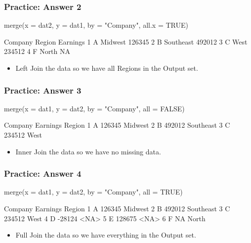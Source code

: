 \documentclass[10pt,american]{beamer}
\renewenvironment{Schunk}{}{}
\renewenvironment{Sinput}{}{}
\begin{document}
\begin{frame}[containsverbatim]
\frametitle{Practice: Answer 2}
\begin{Schunk}
\begin{Sinput}
 merge(x = dat2, y = dat1, by = "Company", all.x = TRUE)
\end{Sinput}
\begin{Soutput}
  Company    Region Earnings
1       A   Midwest   126345
2       B Southeast   492012
3       C      West   234512
4       F     North       NA
\end{Soutput}
\end{Schunk}
\begin{itemize}
\item Left Join the data so we have all Regions in the Output set.
\end{itemize}
\end{frame}


\begin{frame}[containsverbatim]
\frametitle{Practice: Answer 3}
\begin{Schunk}
\begin{Sinput}
 merge(x = dat1, y = dat2, by = "Company", all = FALSE)
\end{Sinput}
\begin{Soutput}
  Company Earnings    Region
1       A   126345   Midwest
2       B   492012 Southeast
3       C   234512      West
\end{Soutput}
\end{Schunk}
\begin{itemize}
\item Inner Join the data so we have no missing data.
\end{itemize}
\end{frame}


\begin{frame}[containsverbatim]
\frametitle{Practice: Answer 4}
\begin{Schunk}
\begin{Sinput}
 merge(x = dat1, y = dat2, by = "Company", all = TRUE)
\end{Sinput}
\begin{Soutput}
  Company Earnings    Region
1       A   126345   Midwest
2       B   492012 Southeast
3       C   234512      West
4       D   -28124      <NA>
5       E   128675      <NA>
6       F       NA     North
\end{Soutput}
\end{Schunk}
\begin{itemize}
\item Full Join the data so we have everything in the Output set. 
\end{itemize}
\end{frame}
\end{document}
